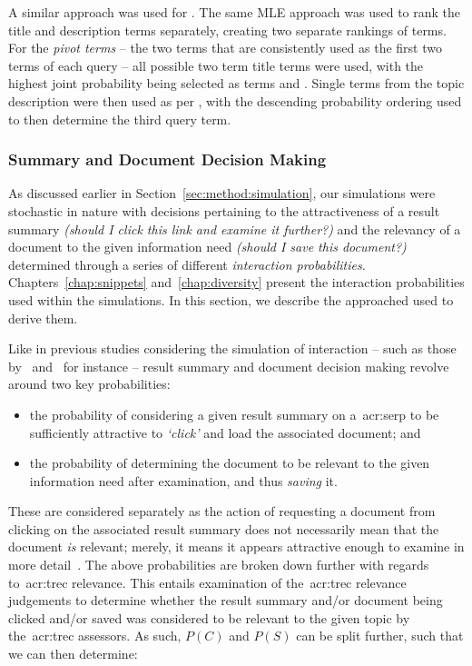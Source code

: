 A similar approach was used for . The same MLE approach was used to rank the title and description terms separately, creating two separate rankings of terms. For the \emph{pivot terms} -- the two terms that are consistently used as the first two terms of each  query -- all possible two term title terms were used, with the highest joint probability being selected as terms  and . Single terms from the topic description were then used as per , with the descending probability ordering used to then determine the third query term.

\subsubsection{Summary and Document Decision Making}\label{sec:method:simulation:grounding:judgements}
As discussed earlier in Section~\ref{sec:method:simulation}, our simulations were stochastic in nature with decisions pertaining to the attractiveness of a result summary \emph{(should I click this link and examine it further?)} and the relevancy of a document to the given information need \emph{(should I save this document?)} determined through a series of different \emph{interaction probabilities.} Chapters~\ref{chap:snippets} and~\ref{chap:diversity} present the interaction probabilities used within the simulations. In this section, we describe the approached used to derive them.

Like in previous studies considering the simulation of interaction -- such as those by~\cite{yilmaz2010browsing_utility} and~\cite{baskaya2013behavioural_factors} for instance -- result summary and document decision making revolve around two key probabilities:

\begin{itemize}
    \item{the probability  of considering a given result summary on a~\gls{acr:serp} to be sufficiently attractive to \emph{`click'} and load the associated document; and}
    \item{the probability  of determining the document to be relevant to the given information need after examination, and thus \emph{saving} it.}
\end{itemize}

These are considered separately as the action of requesting a document from clicking on the associated result summary does not necessarily mean that the document \emph{is} relevant; merely, it means it appears attractive enough to examine in more detail~\citep{turpin2009summaries}. The above probabilities are broken down further with regards to~\gls{acr:trec} relevance. This entails examination of the~\gls{acr:trec} relevance judgements to determine whether the result summary and/or document being clicked and/or saved was considered to be relevant to the given topic by the~\gls{acr:trec} assessors. As such, $P(C)$ and $P(S)$ can be split further, such that we can then determine:


